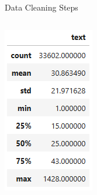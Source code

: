 \documentclass[aspectratio=169]{beamer}
\begin{document}
\begin{frame}{Data Cleaning Steps}
\begin{columns}[T]
    \begin{column}{0.25\textwidth}
    \centering
      \includegraphics[width=\textwidth]{TruncateReason.png}
    \end{column}
  \end{columns}
\end{frame}

\end{document}

